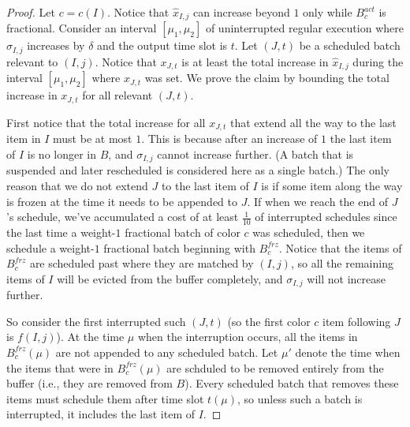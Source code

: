 \documentclass[12pt]{article}
\begin{document}
\begin{proof}
Let $c=c(I)$. Notice that $\hat{x}_{I,j}$ can increase beyond $1$ only
while $B_c^{act}$ is fractional.
Consider an interval $[\mu_1,\mu_2]$ 
of uninterrupted regular execution
where $\sigma_{I,j}$ increases by $\delta$ and the output time slot is $t$.
Let $(J,t)$ be a scheduled batch relevant to $(I,j)$. Notice that
$x_{J,t}$ is at least the total increase in $\hat{x}_{I,j}$ during 
the interval $[\mu_1,\mu_2]$ where $x_{J,t}$ was set. We prove 
the claim by bounding the total increase in $x_{J,t}$ for all 
relevant $(J,t)$.

First notice that the total increase for all $x_{J,t}$ that extend all 
the way to the last item in $I$ must be at most $1$. This is because after 
an increase of $1$ the last item of $I$ is no longer in $B$, and 
$\sigma_{I,j}$ cannot increase further. (A batch that is suspended
and later rescheduled is considered here as a single batch.)
The only reason that we 
do not extend $J$ to the last item of $I$ is if some item along the 
way is frozen at the time it needs to be appended to $J$.
If when 
we reach the end of $J$'s schedule, we've accumulated a cost of 
at least $\frac{1}{10}$ of interrupted schedules since the last time
a weight-$1$ fractional batch of color $c$ was scheduled, then we schedule a 
weight-$1$ fractional batch beginning with $B_c^{frz}$. Notice that 
the items of $B_c^{frz}$ are scheduled past where they
are matched by $(I,j)$, so all the remaining items of $I$ will be 
evicted from the buffer completely, and $\sigma_{I,j}$ will not 
increase further. 

So consider the first interrupted such $(J,t)$ (so the first color $c$ 
item following $J$ is $f(I,j)$). At the time $\mu$
when the interruption occurs, all the items in $B_c^{frz}(\mu)$ are 
not appended to
any scheduled batch. Let $\mu'$ denote the time when the items
that were in $B_c^{frz}(\mu)$ are schduled to be removed
entirely from the buffer (i.e., they are removed from $B$). Every
scheduled batch that removes these items must schedule them after
time slot $t(\mu)$, so unless such a batch is interrupted, it includes 
the last item of $I$.


\end{proof}
\end{document}
